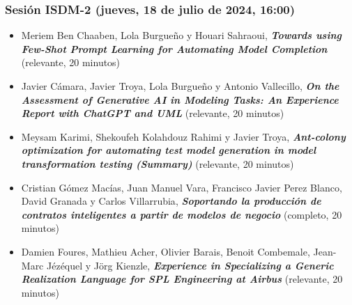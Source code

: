 \begin{frame}
  \frametitle{Sesión ISDM-2 (jueves, 18 de julio de 2024, 16:00)}
\begin{itemize}

\item \small{Meriem Ben Chaaben, Lola Burgueño y Houari Sahraoui}, %
      {\bfseries\itshape Towards using Few-Shot Prompt Learning for Automating Model Completion} %
      \small{(relevante, 20 minutos)}

\item \small{Javier Cámara, Javier Troya, Lola Burgueño y Antonio Vallecillo}, %
      {\bfseries\itshape On the Assessment of Generative AI in Modeling Tasks: An Experience Report with ChatGPT and UML} %
      \small{(relevante, 20 minutos)}

\item \small{Meysam Karimi, Shekoufeh Kolahdouz Rahimi y Javier Troya}, %
      {\bfseries\itshape Ant-colony optimization for automating test model generation in model transformation testing (Summary)} %
      \small{(relevante, 20 minutos)}

\item \small{Cristian Gómez Macías, Juan Manuel Vara, Francisco Javier Perez Blanco, David Granada y Carlos Villarrubia}, %
      {\bfseries\itshape Soportando la producción de contratos inteligentes a partir de modelos de negocio} %
      \small{(completo, 20 minutos)}

\item \small{Damien Foures, Mathieu Acher, Olivier Barais, Benoit Combemale, Jean-Marc Jézéquel y Jörg Kienzle}, %
      {\bfseries\itshape Experience in Specializing a Generic Realization Language for SPL Engineering at Airbus} %
      \small{(relevante, 20 minutos)}

\end{itemize}
\end{frame}